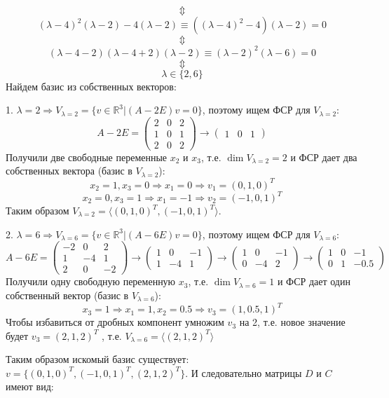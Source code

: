 \documentclass{article}
\begin{document}
$$\Updownarrow$$
$$(\lambda-4)^2(\lambda-2)-4(\lambda-2)\equiv((\lambda-4)^2-4)(\lambda-2)=0$$
$$\Updownarrow$$
$$(\lambda-4-2)(\lambda-4+2)(\lambda-2)\equiv(\lambda-2)^2(\lambda-6)=0$$
$$\Updownarrow$$
$$\lambda\in\{2,6\}$$
Найдем базис из собственных векторов:
\par
1. $\lambda=2\Rightarrow V_{\lambda=2}=\{v\in\mathbb{R}^3|(A-2E)v=0\}$, поэтому ищем ФСР для $V_{\lambda=2}$:
$$A-2E=\left(\begin{array}{rrr}2 & 0 & 2\\1 & 0 & 1\\2 & 0 & 2\end{array}\right)\rightarrow\left(\begin{array}{rrr}1&0&1\end{array}\right)$$
Получили две свободные переменные $x_2$ и $x_3$, т.е. $\dim V_{\lambda=2}=2$ и ФСР дает два собственных вектора (базис в $V_{\lambda=2}$):
$$x_2=1, x_3=0\Rightarrow x_1=0\Rightarrow v_1=(0, 1, 0)^T$$
$$x_2=0, x_3=1\Rightarrow x_1=-1\Rightarrow v_2=(-1,0,1)^T$$
Таким образом $V_{\lambda=2}=\langle(0,1,0)^T,(-1,0,1)^T\rangle$.
\par
2. $\lambda=6\Rightarrow V_{\lambda=6}=\{v\in\mathbb{R}^3|(A-6E)v=0\}$, поэтому ищем ФСР для $V_{\lambda=6}$:
$$A-6E=\left(\begin{array}{rrr}-2 & 0 & 2\\1 & -4 & 1\\2 & 0 & -2\end{array}\right)\rightarrow\left(\begin{array}{rrr}1&0&-1\\1&-4&1\end{array}\right)\rightarrow\left(\begin{array}{rrr}1&0&-1\\0&-4&2\end{array}\right)\rightarrow\left(\begin{array}{rrr}1&0&-1\\0&1&-0.5\end{array}\right)$$
Получили одну свободную переменную $x_3$, т.е. $\dim V_{\lambda=6}=1$ и ФСР дает один собственный вектор (базис в $V_{\lambda=6}$):
$$x_3=1\Rightarrow x_1=1, x_2=0.5 \Rightarrow v_3=(1, 0.5, 1)^T$$
Чтобы избавиться от дробных компонент умножим $v_3$ на 2, т.е.  новое значение будет $v_3=(2, 1, 2)^T$ , т.е. $V_{\lambda=6}=\langle (2,1,2)^T\rangle$
\par
Таким образом искомый базис существует: $v=\{(0,1,0)^T,(-1,0,1)^T, (2,1,2)^T\}$. И следовательно матрицы $D$ и $C$ имеют вид:
\end{document}
